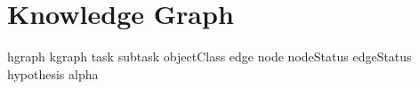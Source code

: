 
\section{Knowledge Graph}%
\label{sec:kgraph}

\gls{hgraph}
\gls{kgraph}
\gls{task}
\gls{subtask}
\gls{objectClass}
\gls{edge}
\gls{node}
\gls{nodeStatus}
\gls{edgeStatus}
\gls{hypothesis}
\gls{alpha}






